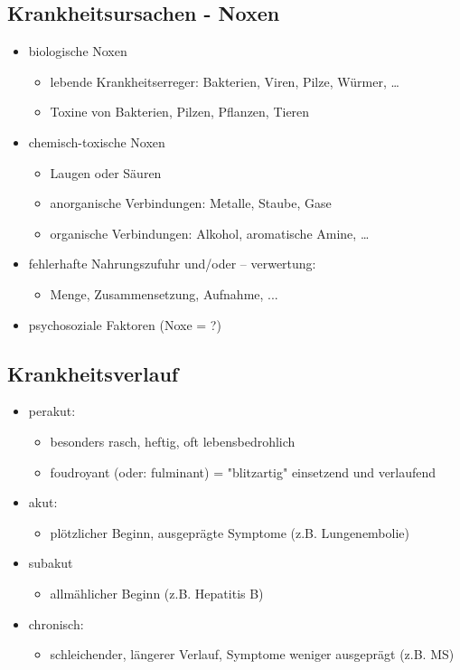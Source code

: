 \subsection{Krankheitsursachen - Noxen}
	\begin{itemize}
		\item biologische Noxen
			\begin{itemize}
				\item lebende Krankheitserreger: Bakterien, Viren, Pilze, Würmer, …
				\item Toxine von Bakterien, Pilzen, Pflanzen, Tieren
			\end{itemize}
		\item chemisch-toxische Noxen
			\begin{itemize}
				\item Laugen oder Säuren
				\item anorganische Verbindungen: Metalle, Staube, Gase
				\item organische Verbindungen: Alkohol, aromatische Amine, …
			\end{itemize}
		\item fehlerhafte Nahrungszufuhr und/oder – verwertung:
			\begin{itemize}
				\item Menge, Zusammensetzung, Aufnahme, ...
			\end{itemize}
		\item psychosoziale Faktoren (Noxe = ?)
	\end{itemize}

\subsection{Krankheitsverlauf}
	\begin{itemize}
		\item perakut:
			\begin{itemize}
				\item besonders rasch, heftig, oft lebensbedrohlich
				\item foudroyant (oder: fulminant) = "blitzartig" einsetzend und verlaufend
			\end{itemize}
		\item akut:
			\begin{itemize}
				\item plötzlicher Beginn, ausgeprägte Symptome (z.B. Lungenembolie)
			\end{itemize}
		\item subakut
			\begin{itemize}
				\item allmählicher Beginn (z.B. Hepatitis B)
			\end{itemize}
		\item chronisch:
			\begin{itemize}
				\item schleichender, längerer Verlauf, Symptome weniger ausgeprägt (z.B. MS)
			\end{itemize}
	\end{itemize}

